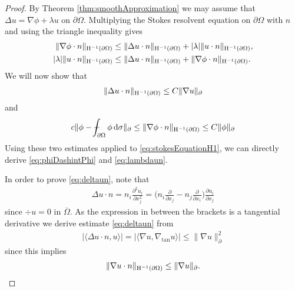 \begin{proof}
  By Theorem \ref{thm:smoothApproximation} we may assume that $\Delta u = \nabla \phi + \lambda u$ on $\partial\Omega$.
  Multiplying the Stokes resolvent equation on $\partial\Omega$ with $n$ and using the triangle inequality gives
  \begin{align}
    \|\nabla \phi \cdot n\|_{\mathrm{H}^{-1}(\partial\Omega)} 
    &\leq \|\Delta u \cdot n \|_{\mathrm{H}^{-1}(\partial\Omega)} + |\lambda| \| u\cdot n\|_{\mathrm{H}^{-1}(\partial\Omega)}, \nonumber\\
    \label{eq:stokesEquationH1}
    |\lambda| \| u\cdot n \|_{\mathrm{H}^{-1}(\partial\Omega)} 
    &\leq \|\Delta u \cdot n \|_{\mathrm{H}^{-1}(\partial\Omega)} + \|\nabla \phi \cdot n \|_{\mathrm{H}^{-1}(\partial\Omega)}.
  \end{align}
  We will now show that
  \begin{align}
    \label{eq:deltaun}
    \|\Delta u \cdot n\|_{\mathrm{H}^{-1}(\partial\Omega)}
    \leq C \|\nabla u\|_\partial
  \end{align}
  and 
  \begin{align}
    \label{eq:nablaPhin}
    c \| \phi - \dashint_{\partial\Omega} \phi \d\sigma \|_\partial
    \leq \|\nabla \phi \cdot n\|_{\HH^{-1}(\partial\Omega)}
    \leq C \|\phi\|_\partial
  \end{align}
  Using these two estimates applied to \eqref{eq:stokesEquationH1}, we can directly derive \eqref{eq:phiDashintPhi} and \eqref{eq:lambdaun}.

  In order to prove \eqref{eq:deltaun}, note that
  \begin{align*}
    \Delta u \cdot n = n_i \frac{\partial^2 u_i}{\partial x_j^2} = \Big( n_i \frac{\partial}{\partial x_j} - n_j \frac{\partial}{\partial x_i} \Big) \frac{\partial u_i}{\partial x_j}
  \end{align*}
  since $\div u = 0$ in $\overline \Omega$.
  As the expression in between the brackets is a tangential derivative we derive estimate \eqref{eq:deltaun} from
  \begin{align*}
    | \langle \Delta u \cdot n, u \rangle | = | \langle \nabla u, \nabla_{\mathrm{tan}} u \rangle| \leq \|\nabla u\|_\partial^2
  \end{align*}
  since this implies 
  \begin{align*}
    \|\nabla u \cdot  n\|_{\mathrm{H}^{-1}(\partial\Omega)} \leq \|\nabla u\|_\partial.
  \end{align*}


\end{proof}
